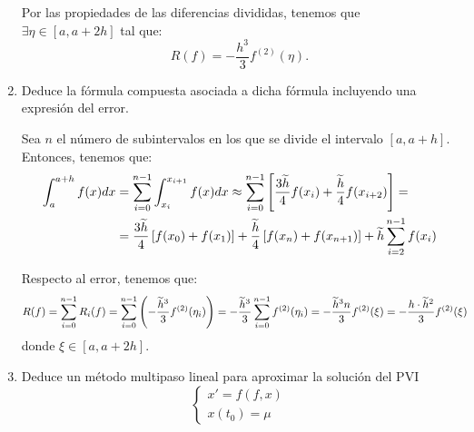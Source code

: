 \begin{ejercicio}[DGIIM 2023/24]
\begin{enumerate}
        Por las propiedades de las diferencias divididas, tenemos que $\exists \eta\in [a, a + 2h]$ tal que:
        \begin{equation*}
            R(f) = -\dfrac{h^3}{3}f^{(2)}(\eta).
        \end{equation*}
        \item Deduce la fórmula compuesta asociada a dicha fórmula incluyendo una expresión del error.
        
        Sea $n$ el número de subintervalos en los que se divide el intervalo $[a, a + h]$. Entonces, tenemos que:
        \begin{align*}
            \int_{a}^{a + h} f(x)dx &= \sum_{i=0}^{n-1}\int_{x_i}^{x_{i+1}} f(x)dx
            \approx \sum_{i=0}^{n-1}\left[\frac{3\widetilde{h}}{4}f(x_i) + \frac{\widetilde{h}}{4}f(x_{i+2})\right]
            =\\&= \dfrac{3\widetilde{h}}{4}\left[f(x_0) + f(x_1)\right] + \dfrac{\widetilde{h}}{4}\left[f(x_n) + f(x_{n+1})\right]
            + \widetilde{h}\sum_{i=2}^{n-1}f(x_i)
        \end{align*}

        Respecto al error, tenemos que:
        \begin{align*}
            R(f) &= \sum_{i=0}^{n-1}R_i(f) = \sum_{i=0}^{n-1}\left(-\dfrac{\widetilde{h}^3}{3}f^{(2)}(\eta_i)\right)
            = -\dfrac{\widetilde{h}^3}{3}\sum_{i=0}^{n-1}f^{(2)}(\eta_i)
            = -\dfrac{\widetilde{h}^3n}{3}f^{(2)}(\xi)
            = -\dfrac{h\cdot \widetilde{h}^2}{3}f^{(2)}(\xi)
        \end{align*}
        donde $\xi\in [a, a + 2h]$.
        \item Deduce un método multipaso lineal para aproximar la solución del PVI
        \begin{equation*}
            \begin{cases}
                x' = f(f, x) \\
                x(t_0) = \mu
            \end{cases}
        \end{equation*}

    \end{enumerate}
\end{ejercicio}

